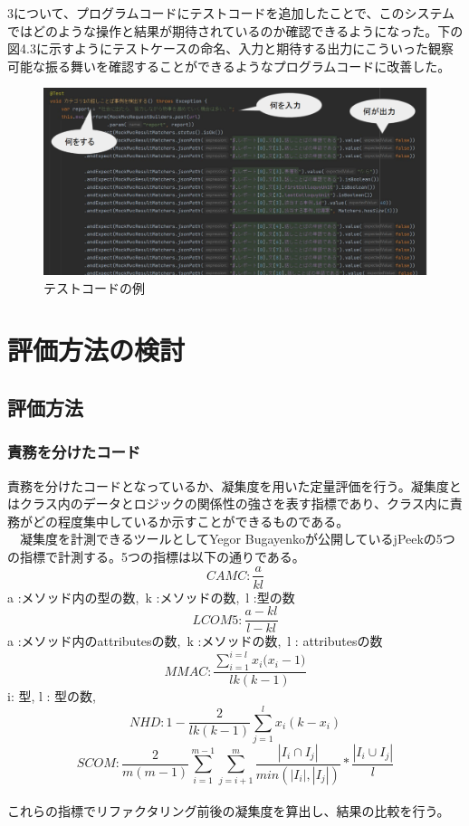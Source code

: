 \documentclass[11pt, a4paper]{jreport}
\begin{document}
3について、プログラムコードにテストコードを追加したことで、このシステムではどのような操作と結果が期待されているのか確認できるようになった。下の図4.3に示すようにテストケースの命名、入力と期待する出力にこういった観察可能な振る舞いを確認することができるようなプログラムコードに改善した。
\begin{figure}[H]
\centering
\includegraphics[width=1\linewidth]{image/kaizen3.png}
\caption{テストコードの例}
\label{fig:enter-label}
\end{figure}
\chapter{評価方法の検討}
\section{評価方法}
\subsection{責務を分けたコード}
責務を分けたコードとなっているか、凝集度を用いた定量評価を行う。凝集度とはクラス内のデータとロジックの関係性の強さを表す指標であり、クラス内に責務がどの程度集中しているか示すことができるものである。
\\　凝集度を計測できるツールとしてYegor Bugayenkoが公開しているjPeekの5つの指標で計測する。5つの指標は以下の通りである。
\\
\begin{equation}
CAMC:
\frac{a}{kl}
\end{equation}
a :メソッド内の型の数,~k :メソッドの数,~l :型の数
\begin{equation}
LCOM5:
\frac{a-kl}{l-kl}
\end{equation}
a :メソッド内のattributesの数,~k :メソッドの数,~l : attributesの数
\begin{equation}
MMAC:
\frac{\sum^{i=l}_{i=1}{{x}_{i}{({x}_{i}-1})}}{lk(k-1)}
\end{equation}
i: 型, l : 型の数,
\begin{equation}
NHD:
1-\frac{2}{lk(k-1)}\sum^{l}_{j=1}{x}_{i}{(k-{x}_{i})}
\end{equation}
\begin{equation}
SCOM:
\frac{2}{m(m-1)}\sum^{m-1}_{i=1}\sum^{m}_{j=i+1}\frac{|{I}_{i}\cap{I}_{j}|}{min(|{I}_{i}|,|{I}_{j}|)}*\frac{|{I}_{i}\cup{I}_{j}|}{l}
\end{equation}
\\これらの指標でリファクタリング前後の凝集度を算出し、結果の比較を行う。
\end{document}

